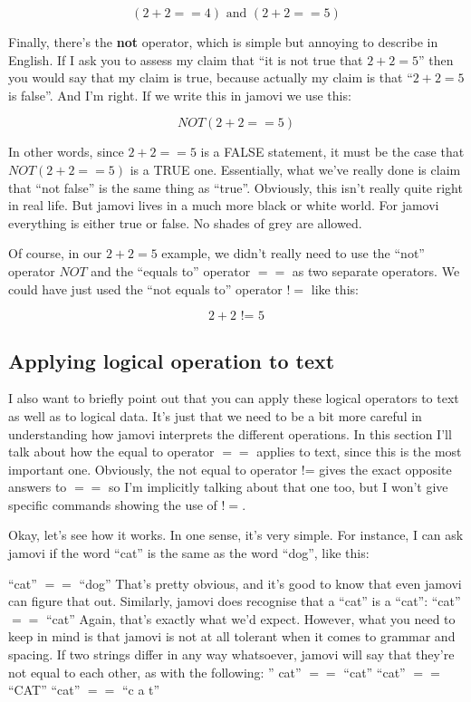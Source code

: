 \documentclass[
  a4paper,
]{book}
\begin{document}
\[(2+2 == 4) \text{ and } (2+2 == 5)\]

Finally, there's the \textbf{not} operator, which is simple but annoying
to describe in English. If I ask you to assess my claim that ``it is not
true that \(2 + 2 = 5\)'' then you would say that my claim is true,
because actually my claim is that ``\(2 + 2 = 5\) is false''. And I'm
right. If we write this in jamovi we use this:

\[NOT(2+2 == 5)\]

In other words, since \(2+2 == 5\) is a FALSE statement, it must be the
case that \(NOT(2+2 == 5)\) is a TRUE one. Essentially, what we've
really done is claim that ``not false'' is the same thing as ``true''.
Obviously, this isn't really quite right in real life. But jamovi lives
in a much more black or white world. For jamovi everything is either
true or false. No shades of grey are allowed.

Of course, in our \(2 + 2 = 5\) example, we didn't really need to use
the ``not'' operator \(NOT\) and the ``equals to'' operator \(==\) as
two separate operators. We could have just used the ``not equals to''
operator \(!=\) like this:

\[2+2 \text{ != } 5\]

\hypertarget{applying-logical-operation-to-text}{%
\subsection{Applying logical operation to
text}\label{applying-logical-operation-to-text}}

I also want to briefly point out that you can apply these logical
operators to text as well as to logical data. It's just that we need to
be a bit more careful in understanding how jamovi interprets the
different operations. In this section I'll talk about how the equal to
operator \(==\) applies to text, since this is the most important one.
Obviously, the not equal to operator != gives the exact opposite answers
to \(==\) so I'm implicitly talking about that one too, but I won't give
specific commands showing the use of \(!=\).

Okay, let's see how it works. In one sense, it's very simple. For
instance, I can ask jamovi if the word ``cat'' is the same as the word
``dog'', like this:

``cat'' \(==\) ``dog'' That's pretty obvious, and it's good to know that
even jamovi can figure that out. Similarly, jamovi does recognise that a
``cat'' is a ``cat'': ``cat'' \(==\) ``cat'' Again, that's exactly what
we'd expect. However, what you need to keep in mind is that jamovi is
not at all tolerant when it comes to grammar and spacing. If two strings
differ in any way whatsoever, jamovi will say that they're not equal to
each other, as with the following: '' cat'' \(==\) ``cat'' ``cat''
\(==\) ``CAT'' ``cat'' \(==\) ``c a t''
\end{document}
